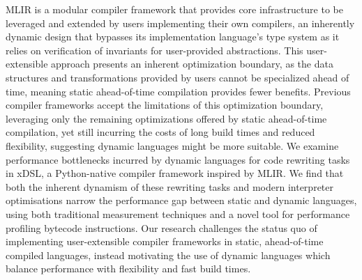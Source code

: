 MLIR is a modular compiler framework that provides core infrastructure to be leveraged and extended by users implementing their own compilers, an inherently dynamic design that bypasses its implementation language's type system as it relies on verification of invariants for user-provided abstractions.
This user-extensible approach presents an inherent optimization boundary, as the data structures and transformations provided by users cannot be specialized ahead of time, meaning static ahead-of-time compilation provides fewer benefits.
Previous compiler frameworks accept the limitations of this optimization boundary, leveraging only the remaining optimizations offered by static ahead-of-time compilation, yet still incurring the costs of long build times and reduced flexibility, suggesting dynamic languages might be more suitable.
We examine performance bottlenecks incurred by dynamic languages for code rewriting tasks in xDSL, a Python-native compiler framework inspired by MLIR.
We find that both the inherent dynamism of these rewriting tasks and modern interpreter optimisations narrow the performance gap between static and dynamic languages, using both traditional measurement techniques and a novel tool for performance profiling bytecode instructions.
Our research challenges the status quo of implementing user-extensible compiler frameworks in static, ahead-of-time compiled languages, instead motivating the use of dynamic languages which balance performance with flexibility and fast build times.

